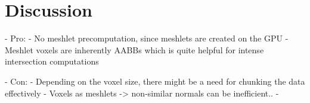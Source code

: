 \chapter{Discussion} \label{cpt-discussion}


- Pro: 
    - No meshlet precomputation, since meshlets are created on the GPU
    - Meshlet voxels are inherently AABBs which is quite helpful for intense intersection computations %

- Con:
    - Depending on the voxel size, there might be a need for chunking the data effectively %
    - Voxels as meshlets -> non-similar normals can be inefficient.. 
    - 